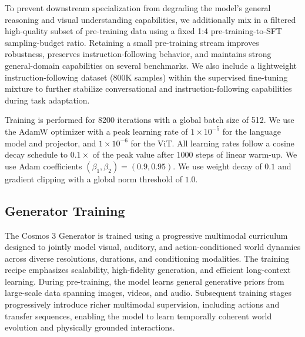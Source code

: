 \documentclass{llmxive}
\begin{document}
To prevent downstream specialization from degrading the model's general reasoning and visual understanding capabilities, we additionally mix in a filtered high-quality subset of pre-training data using a fixed 1:4 pre-training-to-SFT sampling-budget ratio. Retaining a small pre-training stream improves robustness, preserves instruction-following behavior, and maintains strong general-domain capabilities on several benchmarks. We also include a lightweight instruction-following dataset (800K samples) within the supervised fine-tuning mixture to further stabilize conversational and instruction-following capabilities during task adaptation.

Training is performed for 8200 iterations with a global batch size of 512. We use the AdamW optimizer with a peak learning rate of $1{\times}10^{-5}$ for the language model and projector, and $1{\times}10^{-6}$ for the ViT. All learning rates follow a cosine decay schedule to $0.1{\times}$ of the peak value after $1000$ steps of linear warm-up. We use Adam coefficients $(\beta_1, \beta_2) = (0.9, 0.95)$. We use weight decay of $0.1$ and gradient clipping with a global norm threshold of $1.0$.
%

\subsection{Generator Training}
\label{sec:generator-training-recipe}

The Cosmos 3 Generator is trained using a progressive multimodal curriculum designed to jointly model visual, auditory, and action-conditioned world dynamics across diverse resolutions, durations, and conditioning modalities. The training recipe emphasizes scalability, high-fidelity generation, and efficient long-context learning. During pre-training, the model learns general generative priors from large-scale data spanning images, videos, and audio. Subsequent training stages progressively introduce richer multimodal supervision, including actions and transfer sequences, enabling the model to learn temporally coherent world evolution and physically grounded interactions.
\end{document}
